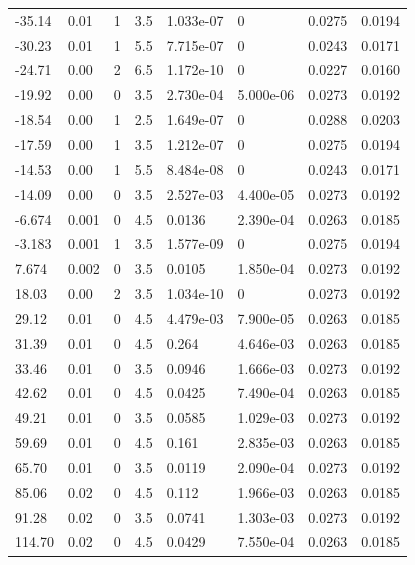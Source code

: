 \documentclass[preview]{standalone}
\begin{document}
{{\begin{tabular}{L{1.2cm}C{1.2cm} C{0.3cm}C{0.5cm} C{1.4cm}C{1.4cm} C{1.4cm}C{1.4cm}}
  -35.14  &  0.01  & 1     & 3.5 &  1.033e-07  & 0  & 0.0275 &  0.0194   \\ 
  -30.23  &  0.01  & 1     & 5.5 &  7.715e-07  & 0  & 0.0243 &  0.0171   \\ 
  -24.71  &  0.00  & 2     & 6.5 &  1.172e-10  & 0  & 0.0227 &  0.0160   \\ 
  -19.92  &  0.00  & 0     & 3.5 &  2.730e-04  & 5.000e-06  & 0.0273 &  0.0192   \\ 
  -18.54  &  0.00  & 1     & 2.5 &  1.649e-07  & 0  & 0.0288 &  0.0203   \\ 
  -17.59  &  0.00  & 1     & 3.5 &  1.212e-07  & 0  & 0.0275 &  0.0194   \\ 
  -14.53  &  0.00  & 1     & 5.5 &  8.484e-08  & 0  & 0.0243 &  0.0171   \\ 
  -14.09  &  0.00  & 0     & 3.5 &  2.527e-03  & 4.400e-05  & 0.0273 &  0.0192   \\ 
  -6.674  &  0.001  & 0     & 4.5 &  0.0136  & 2.390e-04  & 0.0263 &  0.0185   \\ 
  -3.183  &  0.001  & 1     & 3.5 &  1.577e-09  & 0  & 0.0275 &  0.0194   \\ 
  7.674  &  0.002  & 0     & 3.5 &  0.0105  & 1.850e-04  & 0.0273 &  0.0192   \\ 
  18.03  &  0.00  & 2     & 3.5 &  1.034e-10  & 0  & 0.0273 &  0.0192   \\ 
  29.12  &  0.01  & 0     & 4.5 &  4.479e-03  & 7.900e-05  & 0.0263 &  0.0185   \\ 
  31.39  &  0.01  & 0     & 4.5 &  0.264  & 4.646e-03  & 0.0263 &  0.0185   \\ 
  33.46  &  0.01  & 0     & 3.5 &  0.0946  & 1.666e-03  & 0.0273 &  0.0192   \\ 
  42.62  &  0.01  & 0     & 4.5 &  0.0425  & 7.490e-04  & 0.0263 &  0.0185   \\ 
  49.21  &  0.01  & 0     & 3.5 &  0.0585  & 1.029e-03  & 0.0273 &  0.0192   \\ 
  59.69  &  0.01  & 0     & 4.5 &  0.161  & 2.835e-03  & 0.0263 &  0.0185   \\ 
  65.70  &  0.01  & 0     & 3.5 &  0.0119  & 2.090e-04  & 0.0273 &  0.0192   \\ 
  85.06  &  0.02  & 0     & 4.5 &  0.112  & 1.966e-03  & 0.0263 &  0.0185   \\ 
  91.28  &  0.02  & 0     & 3.5 &  0.0741  & 1.303e-03  & 0.0273 &  0.0192   \\ 
  114.70  &  0.02  & 0     & 4.5 &  0.0429  & 7.550e-04  & 0.0263 &  0.0185   \\ 

\end{tabular}}}
\end{document}
